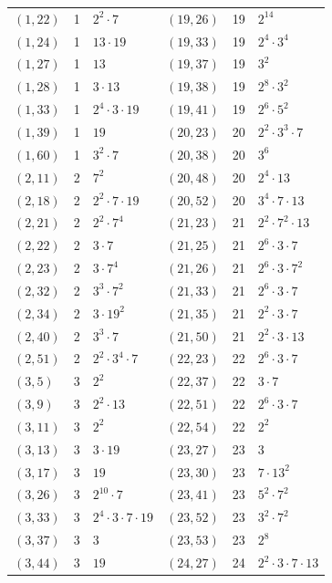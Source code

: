 \documentclass[11pt]{article}
\begin{document}
\begin{longtable}{@{}lrl@{\qquad}lrl@{}}
$(1,22)$ & 1 & $2^{2}\cdot 7$ & $(19,26)$ & 19 & $2^{14}$\\
$(1,24)$ & 1 & $13\cdot 19$ & $(19,33)$ & 19 & $2^{4}\cdot 3^{4}$\\
$(1,27)$ & 1 & $13$ & $(19,37)$ & 19 & $3^{2}$\\
$(1,28)$ & 1 & $3\cdot 13$ & $(19,38)$ & 19 & $2^{8}\cdot 3^{2}$\\
$(1,33)$ & 1 & $2^{4}\cdot 3\cdot 19$ & $(19,41)$ & 19 & $2^{6}\cdot 5^{2}$\\
$(1,39)$ & 1 & $19$ & $(20,23)$ & 20 & $2^{2}\cdot 3^{3}\cdot 7$\\
$(1,60)$ & 1 & $3^{2}\cdot 7$ & $(20,38)$ & 20 & $3^{6}$\\
$(2,11)$ & 2 & $7^{2}$ & $(20,48)$ & 20 & $2^{4}\cdot 13$\\
$(2,18)$ & 2 & $2^{2}\cdot 7\cdot 19$ & $(20,52)$ & 20 & $3^{4}\cdot 7\cdot 13$\\
$(2,21)$ & 2 & $2^{2}\cdot 7^{4}$ & $(21,23)$ & 21 & $2^{2}\cdot 7^{2}\cdot 13$\\
$(2,22)$ & 2 & $3\cdot 7$ & $(21,25)$ & 21 & $2^{6}\cdot 3\cdot 7$\\
$(2,23)$ & 2 & $3\cdot 7^{4}$ & $(21,26)$ & 21 & $2^{6}\cdot 3\cdot 7^{2}$\\
$(2,32)$ & 2 & $3^{3}\cdot 7^{2}$ & $(21,33)$ & 21 & $2^{6}\cdot 3\cdot 7$\\
$(2,34)$ & 2 & $3\cdot 19^{2}$ & $(21,35)$ & 21 & $2^{2}\cdot 3\cdot 7$\\
$(2,40)$ & 2 & $3^{3}\cdot 7$ & $(21,50)$ & 21 & $2^{2}\cdot 3\cdot 13$\\
$(2,51)$ & 2 & $2^{2}\cdot 3^{4}\cdot 7$ & $(22,23)$ & 22 & $2^{6}\cdot 3\cdot 7$\\
$(3,5)$ & 3 & $2^{2}$ & $(22,37)$ & 22 & $3\cdot 7$\\
$(3,9)$ & 3 & $2^{2}\cdot 13$ & $(22,51)$ & 22 & $2^{6}\cdot 3\cdot 7$\\
$(3,11)$ & 3 & $2^{2}$ & $(22,54)$ & 22 & $2^{2}$\\
$(3,13)$ & 3 & $3\cdot 19$ & $(23,27)$ & 23 & $3$\\
$(3,17)$ & 3 & $19$ & $(23,30)$ & 23 & $7\cdot 13^{2}$\\
$(3,26)$ & 3 & $2^{10}\cdot 7$ & $(23,41)$ & 23 & $5^{2}\cdot 7^{2}$\\
$(3,33)$ & 3 & $2^{4}\cdot 3\cdot 7\cdot 19$ & $(23,52)$ & 23 & $3^{2}\cdot 7^{2}$\\
$(3,37)$ & 3 & $3$ & $(23,53)$ & 23 & $2^{8}$\\
$(3,44)$ & 3 & $19$ & $(24,27)$ & 24 & $2^{2}\cdot 3\cdot 7\cdot 13$\\

\end{longtable}
\end{document}
